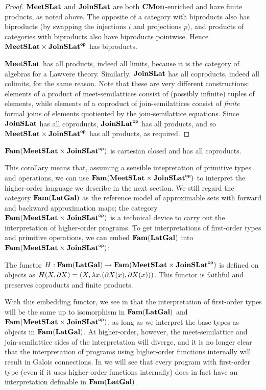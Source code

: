 \begin{proof}
  $\mathbf{MeetSLat}$ and $\mathbf{JoinSLat}$ are both $\mathbf{CMon}$-enriched and have
  finite products, as noted above. The opposite of a category with
  biproducts also has biproducts (by swapping the injections $i$ and
  projections $p$), and products of categories with biproducts also
  have biproducts pointwise. Hence $\mathbf{MeetSLat} \times \mathbf{JoinSLat}^{\mathsf{op}}$
  has biproducts.

  $\mathbf{MeetSLat}$ has all products, indeed all limits, because it is the
  category of algebras for a Lawvere theory. Similarly, $\mathbf{JoinSLat}$
  has all coproducts, indeed all colimits, for the same reason. Note
  that these are very different constructions: elements of a product
  of meet-semilattices consist of (possibly infinite) tuples of
  elements, while elements of a coproduct of join-semilattices consist
  of \emph{finite} formal joins of elements quotiented by the
  join-semilattice equations. Since $\mathbf{JoinSLat}$ has all coproducts,
  $\mathbf{JoinSLat}^{\mathsf{op}}$ has all products, and so
  $\mathbf{MeetSLat} \times \mathbf{JoinSLat}^{\mathsf{op}}$ has all products, as required.
\end{proof}

\begin{corollary}
  \label{cor:mslat-jslat-bcc}
  $\mathbf{Fam}(\mathbf{MeetSLat} \times \mathbf{JoinSLat}^{\mathsf{op}})$ is cartesian closed and has
  all coproducts.
\end{corollary}

This corollary means that, assuming a sensible intepretation of
primitive types and operations, we can use
$\mathbf{Fam}(\mathbf{MeetSLat} \times \mathbf{JoinSLat}^{\mathsf{op}})$ to interpret the higher-order
language we describe in the next section. We still regard the category
$\mathbf{Fam}(\mathbf{LatGal})$ as the reference model of approximable sets with
forward and backward approximation maps; the category
$\mathbf{Fam}(\mathbf{MeetSLat} \times \mathbf{JoinSLat}^{\mathsf{op}})$ is a technical device to carry
out the interpretation of higher-order programs. To get
interpretations of first-order types and primitive operations, we can
embed $\mathbf{Fam}(\mathbf{LatGal})$ into $\mathbf{Fam}(\mathbf{MeetSLat} \times \mathbf{JoinSLat}^{\mathsf{op}})$:

\begin{proposition}
  \label{prop:ho-embedding}
  The functor
  $H : \mathbf{Fam}(\mathbf{LatGal}) \to \mathbf{Fam}(\mathbf{MeetSLat} \times \mathbf{JoinSLat}^{\mathsf{op}})$ is defined
  on objects as
  $H(X, \partial X) = (X, \lambda x. (\partial X(x), \partial
  X(x)))$. This functor is faithful and preserves coproducts and
  finite products.
\end{proposition}

With this embedding functor, we see in
 that the interpretation of
first-order types will be the same up to isomorphism in
$\mathbf{Fam}(\mathbf{LatGal})$ and $\mathbf{Fam}(\mathbf{MeetSLat} \times \mathbf{JoinSLat}^{\mathsf{op}})$, as long as
we interpret the base types as objects in $\mathbf{Fam}(\mathbf{LatGal})$. At
higher-order, however, the meet-semilattice and join-semilattice sides
of the interpretation will diverge, and it is no longer clear that the
interpretation of programs using higher-order functions internally
will result in Galois connections. In  we will
see that every program with first-order type (even if it uses
higher-order functions internally) does in fact have an interpretation
definable in $\mathbf{Fam}(\mathbf{LatGal})$.

